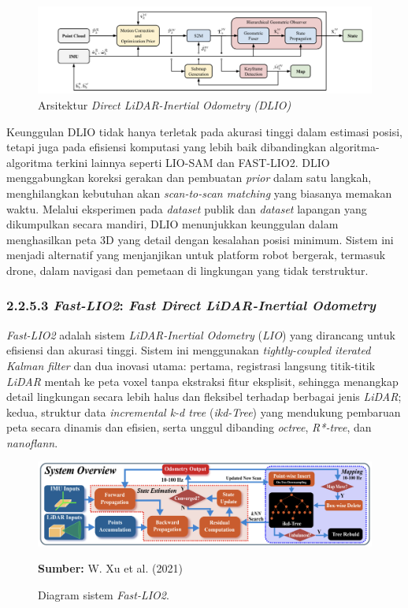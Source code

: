 \begin{figure} [H] \centering
  \includegraphics[scale=0.6]{gambar/bab2/dlio_Arch.png}
  \caption{Arsitektur \emph{Direct LiDAR-Inertial Odometry (DLIO)}}
  \label{fig:DLIO Architecture}
\end{figure}

Keunggulan DLIO tidak hanya terletak pada akurasi tinggi dalam estimasi posisi, tetapi juga pada efisiensi komputasi yang lebih baik dibandingkan algoritma-algoritma terkini lainnya seperti LIO-SAM dan FAST-LIO2. DLIO menggabungkan koreksi gerakan dan pembuatan \emph{prior} dalam satu langkah, menghilangkan kebutuhan akan \emph{scan-to-scan matching} yang biasanya memakan waktu. Melalui eksperimen pada \emph{dataset} publik dan \emph{dataset} lapangan yang dikumpulkan secara mandiri, DLIO menunjukkan keunggulan dalam menghasilkan peta 3D yang detail dengan kesalahan posisi minimum. Sistem ini menjadi alternatif yang menjanjikan untuk platform robot bergerak, termasuk drone, dalam navigasi dan pemetaan di lingkungan yang tidak terstruktur.



\subsubsection{2.2.5.3 \emph{Fast-LIO2}: \emph{Fast Direct LiDAR-Inertial Odometry}}

\emph{Fast-LIO2} adalah sistem \emph{LiDAR-Inertial Odometry} (\emph{LIO}) yang dirancang untuk efisiensi dan akurasi tinggi. Sistem ini menggunakan \emph{tightly-coupled iterated Kalman filter} dan dua inovasi utama: pertama, registrasi langsung titik-titik \emph{LiDAR} mentah ke peta voxel tanpa ekstraksi fitur eksplisit, sehingga menangkap detail lingkungan secara lebih halus dan fleksibel terhadap berbagai jenis \emph{LiDAR}; kedua, struktur data \emph{incremental k-d tree} (\emph{ikd-Tree}) yang mendukung pembaruan peta secara dinamis dan efisien, serta unggul dibanding \emph{octree}, \emph{R*-tree}, dan \emph{nanoflann}.

\begin{figure}[H]
    \centering
    \includegraphics[width=1\textwidth]{gambar/bab2/fast-lio2.png}
    \caption{Diagram sistem \emph{Fast-LIO2}.}
    \label{fig:fastlio2}
    \footnotesize{\textbf{Sumber:} W. Xu et al. (2021)}
\end{figure}


